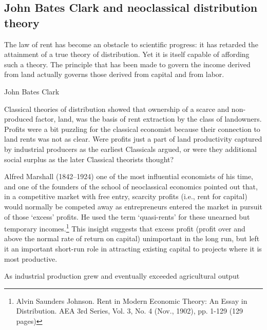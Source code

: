   \subsection{John Bates Clark and neoclassical distribution theory}
  \epigraph{The law of rent has become an obstacle to scientific progress: it has retarded the attainment of a true theory of distribution. Yet it is itself capable of affording such a theory. The principle that has been made to govern the income derived from land actually governs those derived from capital and from labor. }{John Bates Clark \cite{clarkDistributionDeterminedLaw1891}}

Classical theories of distribution showed that ownership of a scarce and non-produced factor, land, was the  basis of rent extraction by the class of landowners. Profits were a bit puzzling for the classical economist because their connection to land rents was not as clear. Were profits just a part of land productivity captured by industrial producers as the earliest Classicals argued, or were they  additional  social surplus as the later Classical theorists thought? %



Alfred Marshall (1842--1924)  one of the most influential economists of his time, and one of the founders of the school of neoclassical economics pointed out that, in a competitive market with free entry, scarcity profits (i.e., rent for capital) would normally be competed away  as entrepreneurs entered the market in pursuit of those `excess' profits. He used the term `quasi-rents' for these unearned but temporary incomes.\footnote{Alvin Saunders Johnson. Rent in Modern Economic Theory: An Essay in Distribution. AEA 3rd Series, Vol. 3, No. 4 (Nov., 1902), pp. 1-129 (129 pages)} This insight suggests that excess profit (profit over and above the normal rate of return on capital) unimportant in the long run, but left it an important short-run role in attracting existing capital to projects where it is most productive. 

As industrial production grew and eventually exceeded agricultural output 

